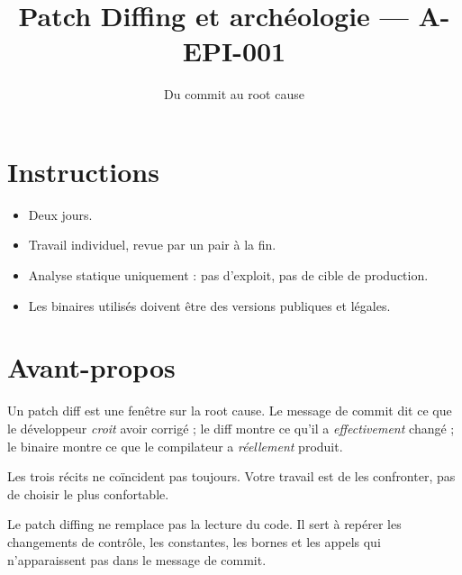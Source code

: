 \documentclass{training}
\begin{document}
\title{Patch Diffing et archéologie --- A-EPI-001}
\subtitle{Du commit au root cause}
\maketitle

\newpage
\tableofcontents
\newpage

\chapter{Instructions}
\begin{itemize}
  \item Deux jours.
  \item Travail individuel, revue par un pair à la fin.
  \item Analyse statique uniquement : pas d'exploit, pas de cible de
        production.
  \item Les binaires utilisés doivent être des versions publiques et
        légales.
\end{itemize}





\chapter{Avant-propos}

Un patch diff est une fenêtre sur la root cause. Le message de commit dit
ce que le développeur \emph{croit} avoir corrigé ; le diff montre ce qu'il
a \emph{effectivement} changé ; le binaire montre ce que le compilateur a
\emph{réellement} produit.

Les trois récits ne coïncident pas toujours. Votre travail est de les
confronter, pas de choisir le plus confortable.

\begin{info}
Le patch diffing ne remplace pas la lecture du code. Il sert à repérer les
changements de contrôle, les constantes, les bornes et les appels qui
n'apparaissent pas dans le message de commit.
\end{info}
\end{document}

